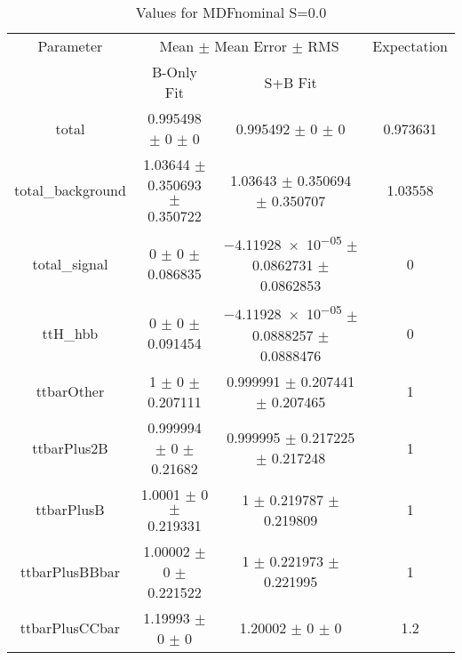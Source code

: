 \begin{table}
\centering
\caption{Values for MDFnominal S=0.0}
\begin{tabular}{cccc}
\toprule
Parameter & \multicolumn{2}{c}{Mean $\pm$ Mean Error $\pm$ RMS} & Expectation\\
 & B-Only Fit & S+B Fit & \\
\midrule
total & \num{0.995498} $\pm$ \num{0} $\pm$ \num{0} & \num{0.995492} $\pm$ \num{0} $\pm$ \num{0} & \num{0.973631}\\
total\_background & \num{1.03644} $\pm$ \num{0.350693} $\pm$ \num{0.350722} & \num{1.03643} $\pm$ \num{0.350694} $\pm$ \num{0.350707} & \num{1.03558}\\
total\_signal & \num{0} $\pm$ \num{0} $\pm$ \num{0.086835} & \num{-4.11928e-05} $\pm$ \num{0.0862731} $\pm$ \num{0.0862853} & \num{0}\\
ttH\_hbb & \num{0} $\pm$ \num{0} $\pm$ \num{0.091454} & \num{-4.11928e-05} $\pm$ \num{0.0888257} $\pm$ \num{0.0888476} & \num{0}\\
ttbarOther & \num{1} $\pm$ \num{0} $\pm$ \num{0.207111} & \num{0.999991} $\pm$ \num{0.207441} $\pm$ \num{0.207465} & \num{1}\\
ttbarPlus2B & \num{0.999994} $\pm$ \num{0} $\pm$ \num{0.21682} & \num{0.999995} $\pm$ \num{0.217225} $\pm$ \num{0.217248} & \num{1}\\
ttbarPlusB & \num{1.0001} $\pm$ \num{0} $\pm$ \num{0.219331} & \num{1} $\pm$ \num{0.219787} $\pm$ \num{0.219809} & \num{1}\\
ttbarPlusBBbar & \num{1.00002} $\pm$ \num{0} $\pm$ \num{0.221522} & \num{1} $\pm$ \num{0.221973} $\pm$ \num{0.221995} & \num{1}\\
ttbarPlusCCbar & \num{1.19993} $\pm$ \num{0} $\pm$ \num{0} & \num{1.20002} $\pm$ \num{0} $\pm$ \num{0} & \num{1.2}\\
\bottomrule
\end{tabular}
\end{table}